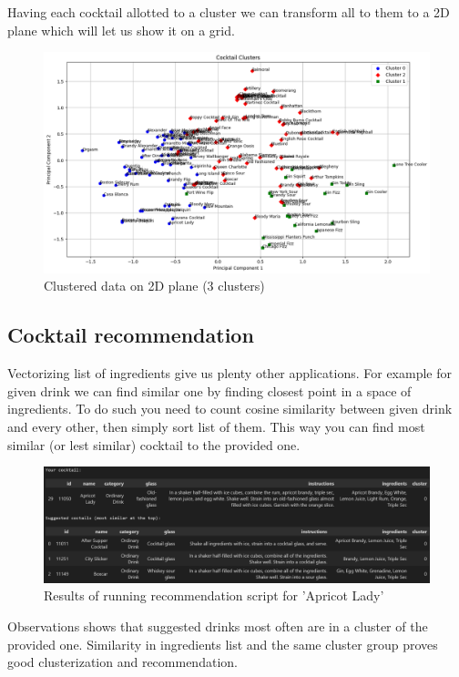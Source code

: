 \documentclass[a4paper]{article}
\begin{document}
Having each cocktail allotted to a cluster we can transform all to them to a 2D plane which will let us show it on a grid.

\begin{figure}[H]
    \centering
    \includegraphics[width=1\linewidth]{plotclusters.png}
    \caption{Clustered data on 2D plane (3 clusters)}
    \label{fig:enter-label}
\end{figure}

\subsection{Cocktail recommendation}
Vectorizing list of ingredients give us plenty other applications. For example for given drink we can find similar one by finding closest point in a space of ingredients. To do such you need to count cosine similarity between given drink and every other, then simply sort list of them. This way you can find most similar (or lest similar) cocktail to the provided one. 

\begin{figure}[H]
    \centering
    \includegraphics[width=1\linewidth]{recommendedcocktail.png}
    \caption{Results of running recommendation script for 'Apricot Lady'}
    \label{fig:enter-label}
\end{figure}

Observations shows that suggested drinks most often are in a cluster of the provided one. Similarity in ingredients list and the same cluster group proves good clusterization and recommendation.
\end{document}
